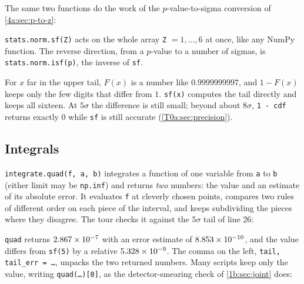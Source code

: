 The same two functions do the work of the $p$-value-to-sigma conversion of \cref{4a:sec:p-to-z}:


\texttt{stats.norm.sf(Z)} acts on the whole array \texttt{Z} $=1,\dots,6$ at once, like any NumPy function. The reverse direction, from a $p$-value to a number of sigmas, is \texttt{stats.norm.isf(p)}, the inverse of \texttt{sf}.

\begin{pitfall}
For $x$ far in the upper tail, $F(x)$ is a number like $0.9999999997$, and $1-F(x)$ keeps only the few digits that differ from $1$. \texttt{sf(x)} computes the tail directly and keeps all sixteen. At $5\sigma$ the difference is still small; beyond about $8\sigma$, \texttt{1 - cdf} returns exactly $0$ while \texttt{sf} is still accurate (\cref{T0a:sec:precision}).
\end{pitfall}

\subsection{Integrals}
\label{T0a:sec:quad}

\texttt{integrate.quad(f, a, b)} integrates a function of one variable from \texttt{a} to \texttt{b} (either limit may be \texttt{np.inf}) and returns \emph{two} numbers: the value and an estimate of its absolute error. It evaluates \texttt{f} at cleverly chosen points, compares two rules of different order on each piece of the interval, and keeps subdividing the pieces where they disagree. The tour checks it against the $5\sigma$ tail of line 26:


\texttt{quad} returns $2.867\times10^{-7}$ with an error estimate of $8.853\times10^{-10}$, and the value differs from \texttt{sf(5)} by a relative $5.328\times10^{-9}$. The comma on the left, \texttt{tail, tail\_err = \dots}, unpacks the two returned numbers. Many scripts keep only the value, writing \texttt{quad(\dots)[0]}, as the detector-smearing check of \cref{1b:sec:joint} does:


